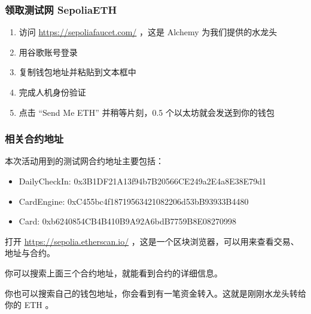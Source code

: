 \documentclass{beamer}
\begin{document}
\begin{frame}
    \frametitle{领取测试网 SepoliaETH}

    \begin{enumerate}
        \item 访问 \url{https://sepoliafaucet.com/} ，这是 Alchemy 为我们提供的水龙头
        \item 用谷歌账号登录
        \item 复制钱包地址并粘贴到文本框中
        \item 完成人机身份验证
        \item 点击 “Send Me ETH” 并稍等片刻，0.5 个以太坊就会发送到你的钱包
    \end{enumerate}

\end{frame}

\begin{frame}
    \frametitle{相关合约地址}

    本次活动用到的测试网合约地址主要包括：

    \begin{itemize}
        \item DailyCheckIn: 0x3B1DF21A13f94b7B20566CE249a2E4a8E38E79d1
        \item CardEngine: 0xC455bc4f18719563421082206d53bB93933B4480
        \item Card: 0xb6240854CB4B410B9A92A6bdB7759B8E08270998
    \end{itemize}

    打开 \url{https://sepolia.etherscan.io/} ，这是一个区块浏览器，可以用来查看交易、地址与合约。
    
    你可以搜索上面三个合约地址，就能看到合约的详细信息。
    
    你也可以搜索自己的钱包地址，你会看到有一笔资金转入。这就是刚刚水龙头转给你的 ETH 。

\end{frame}
\end{document}
